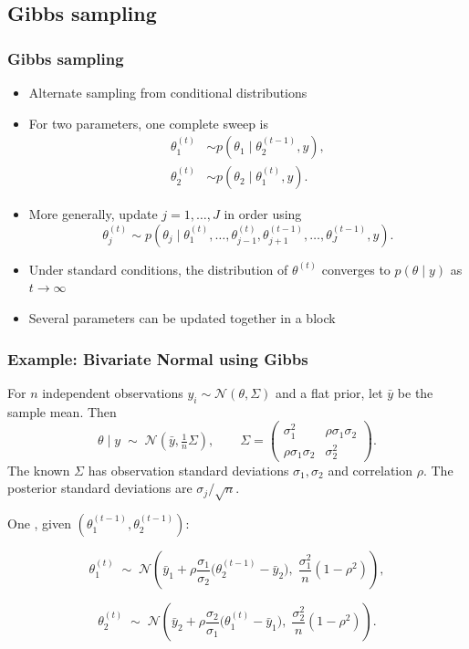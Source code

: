 \documentclass[10pt]{beamer}
\begin{document}
\subsection{Gibbs sampling}
\frame{\subsectionpage}

\begin{frame}

\frametitle{Gibbs sampling}

  \begin{itemize}
  \item Alternate sampling from conditional distributions
  \item For two parameters, one complete sweep is
    \begin{align*}
      \theta_1^{(t)}&\sim
        p(\theta_1\mid\theta_2^{(t-1)},y),\\
      \theta_2^{(t)}&\sim
        p(\theta_2\mid\theta_1^{(t)},y).
    \end{align*}
  \pause
  \item More generally, update $j=1,\ldots,J$ in order using
    \[
      \theta_j^{(t)}\sim p\!\left(\theta_j\mid
      \theta_1^{(t)},\ldots,\theta_{j-1}^{(t)},
      \theta_{j+1}^{(t-1)},\ldots,\theta_J^{(t-1)},y\right).
    \]
  \pause
  \item Under standard conditions, the distribution of $\theta^{(t)}$
    converges to $p(\theta\mid y)$ as $t\rightarrow\infty$
  \item Several parameters can be updated together in a block
  \end{itemize}
\end{frame}

\begin{frame}

\frametitle{Example: Bivariate Normal using Gibbs}

For $n$ independent observations $y_i\sim\mathcal{N}(\theta,\Sigma)$
and a flat prior, let $\bar y$ be the sample mean. Then
\[
\theta \mid y \;\sim\; \mathcal{N}\!\left( \bar{y}, \tfrac{1}{n}\Sigma \right),
\qquad
\Sigma=
\begin{pmatrix}
  \sigma_1^2 & \rho\sigma_1\sigma_2\\
  \rho\sigma_1\sigma_2 & \sigma_2^2
\end{pmatrix}.
\]
The known $\Sigma$ has observation standard deviations $\sigma_1,\sigma_2$
and correlation $\rho$. The posterior standard deviations are
$\sigma_j/\sqrt n$.
\pause

One , given $(\theta_1^{(t-1)},\theta_2^{(t-1)})$:

\[
\theta_1^{(t)} \;\sim\; \mathcal{N}\!\left(
\bar{y}_1 + \rho\frac{\sigma_1}{\sigma_2}
  \big(\theta_2^{(t-1)} - \bar{y}_2\big),\;
\frac{\sigma_1^2}{n}(1-\rho^2)
\right),
\]

\[
\theta_2^{(t)} \;\sim\; \mathcal{N}\!\left(
\bar{y}_2 + \rho\frac{\sigma_2}{\sigma_1}
  \big(\theta_1^{(t)} - \bar{y}_1\big),\;
\frac{\sigma_2^2}{n}(1-\rho^2)
\right).
\]

\end{frame}
\end{document}
